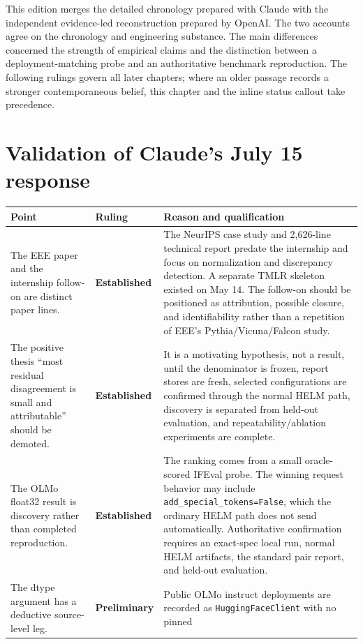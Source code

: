 \documentclass[11pt]{report}
\newcommand{\code}[1]{\texttt{#1}}
\newcommand{\statusEstablished}{\textbf{Established}}
\newcommand{\statusPreliminary}{\textbf{Preliminary}}
\begin{document}
This edition merges the detailed chronology prepared with Claude with the
independent evidence-led reconstruction prepared by OpenAI. The two accounts agree
on the chronology and engineering substance. The main differences concerned the
strength of empirical claims and the distinction between a deployment-matching
probe and an authoritative benchmark reproduction. The following rulings govern all
later chapters; where an older passage records a stronger contemporaneous belief,
this chapter and the inline status callout take precedence.

\section{Validation of Claude's July 15 response}

\begin{longtable}{@{}p{}p{}p{}@{}}
\toprule
\textbf{Point} & \textbf{Ruling} & \textbf{Reason and qualification} \\
\midrule
\endhead
The EEE paper and the internship follow-on are distinct paper lines. &
\statusEstablished & The NeurIPS case study and 2,626-line technical report predate
the internship and focus on normalization and discrepancy detection. A separate
TMLR skeleton existed on May 14. The follow-on should be positioned as attribution,
possible closure, and identifiability rather than a repetition of EEE's
Pythia/Vicuna/Falcon study. \\
The positive thesis ``most residual disagreement is small and attributable'' should
be demoted. & \statusEstablished & It is a motivating hypothesis, not a result,
until the denominator is frozen, report stores are fresh, selected configurations
are confirmed through the normal HELM path, discovery is separated from held-out
evaluation, and repeatability/ablation experiments are complete. \\
The OLMo float32 result is discovery rather than completed reproduction. &
\statusEstablished & The ranking comes from a small oracle-scored IFEval probe. The
winning request behavior may include \code{add\_special\_tokens=False}, which the
ordinary HELM path does not send automatically. Authoritative confirmation requires
an exact-spec local run, normal HELM artifacts, the standard pair report, and
held-out evaluation. \\
The dtype argument has a deductive source-level leg. & \statusPreliminary & Public
OLMo instruct deployments are recorded as \code{HuggingFaceClient} with no pinned

\end{longtable}
\end{document}
